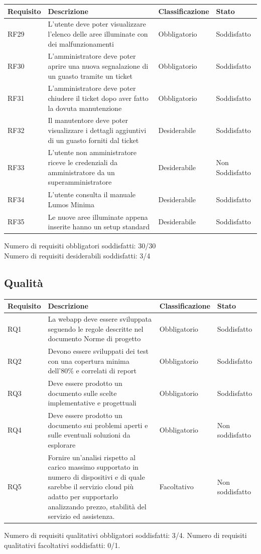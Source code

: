 \documentclass[12pt]{article}
\begin{document}
\begin{tabular}{ |p{1.8cm}|p{5.2cm}|p{2.5cm}| p{3.5cm}| }
	\hline
	Requisito& Descrizione &Classificazione & Stato \\
	\hline	
	RF29	 & L'utente deve poter visualizzare l'elenco delle aree illuminate con dei malfunzionamenti & Obbligatorio & Soddisfatto \\
	\hline				
	RF30	 & L'amministratore deve poter aprire una nuova segnalazione di un guasto tramite un ticket & Obbligatorio & Soddisfatto \\
	\hline				
	RF31	 & L'amministratore deve poter chiudere il ticket dopo aver fatto la dovuta manutenzione & Obbligatorio & Soddisfatto \\
	\hline				
	RF32	 & Il manutentore deve poter visualizzare i dettagli aggiuntivi di un guasto forniti dal ticket & Desiderabile & Soddisfatto \\
	\hline				
	RF33	 & L'utente non amministratore riceve le credenziali da amministratore da un superamministratore & Desiderabile & Non Soddisfatto \\
	\hline				
	RF34	 & L'utente consulta il manuale Lumos Minima & Desiderabile & Soddisfatto \\
	\hline				
	RF35	 & Le nuove aree illuminate appena inserite hanno un setup standard & Desiderabile & Soddisfatto \\
	\hline				
	\end{tabular}
	Numero di requisiti obbligatori soddisfatti: 30/30 \\
	Numero di requisiti desiderabili soddisfatti: 3/4 \\
	\subsection{Qualità}
	\begin{tabular}{ |p{1.8cm}|p{5.2cm}|p{3cm}| p{2cm}| }
	\hline
	Requisito& Descrizione &Classificazione & Stato \\
	\hline
	RQ1 & La webapp deve essere sviluppata seguendo le regole descritte nel documento Norme di progetto & Obbligatorio & Soddisfatto \\
	RQ2 & Devono essere sviluppati dei test con una copertura minima dell'80\% e correlati di report & Obbligatorio & Soddisfatto\\
	RQ3 & Deve essere prodotto un documento sulle scelte implementative e progettuali & Obbligatorio & Soddisfatto \\
	RQ4 & Deve essere prodotto un documento sui problemi aperti e sulle eventuali soluzioni da esplorare & Obbligatorio & Non soddisfatto \\
	RQ5 & Fornire un’analisi rispetto al carico massimo supportato in numero di dispositivi e di quale sarebbe il servizio cloud più adatto per supportarlo analizzando prezzo, stabilità del servizio ed assistenza.  &  Facoltativo & Non soddisfatto \\
	\hline
	
	\end{tabular}
	Numero di requisiti qualitativi obbligatori soddisfatti: 3/4.
	Numero di requisiti qualitativi facoltativi soddisfatti: 0/1.
	\\
	\\
\end{document}
